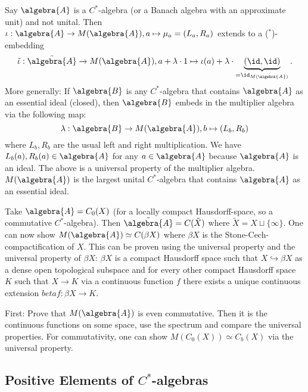 \documentclass[a4paper]{article}
\begin{document}
Say $\algebra{A}$ is a $C^*$-algebra (or a Banach algebra with an approximate unit) and not unital.
Then $\iota: \algebra{A} \to M(\algebra{A}), a \mapsto \mu_a = (L_a, R_a)$ extends to a ($^*$)-embedding 
\begin{equation*}
	\tilde{\iota}: \tilde{\algebra{A}} \to M(\algebra{A}), a + \lambda \cdot 1 \mapsto \iota(a) + \lambda \cdot \underbrace{(\id, \id)}_{= \id_{M(\algebra{A})}}\text{.}
\end{equation*}
More generally: If $\algebra{B}$ is any  $C^*$-algebra that contains $\algebra{A}$ as an essential ideal (closed), then $\algebra{B}$ embeds in the multiplier algebra via the following map:
\begin{equation*}
	\lambda: \algebra{B} \to M(\algebra{A}), b \mapsto (L_b, R_b)
\end{equation*}
where $L_b, R_b$ are the usual left and right multiplication.
We have $L_b(a), R_b(a) \in \algebra{A}$ for any $a \in \algebra{A}$ because $\algebra{A}$ is an ideal.
The above is a universal property of the multiplier algebra.
$M(\algebra{A})$ is the largest unital $C^*$-algebra that contains $\algebra{A}$ as an essential ideal.

\begin{example}
	Take $\algebra{A} = C_0(X)$ (for a locally compact Hausdorff-space, so a commutative $C^*$-algebra).
	Then $\tilde{\algebra{A}} = C(\tilde{X})$ where $\tilde{X} = X \sqcup \{\infty\}$.
	One can now show $M(\algebra{A}) \simeq C(\beta X)$ where $\beta X$ is the Stone-Cech-compactification of $X$.
	This can be proven using the universal property and the universal property of $\beta X$:
	$\beta X$ is a compact Hausdorff space such that $X \hookrightarrow \beta X$ as a dense open topological subspace and for every other compact Hausdorff space $K$ such that $X \to K$ via a continuous function $f$ there exists a unique continuous extension $beta f: \beta X \to K$.

	First: Prove that $M(\algebra{A})$ is even commutative.
	Then it is the continuous functions on some space, use the spectrum and compare the universal properties.
	For commutativity, one can show $M(C_0(X)) \simeq C_b(X)$ via the universal property.
\end{example}



\subsection{Positive Elements of $C^*$-algebras}
\end{document}

